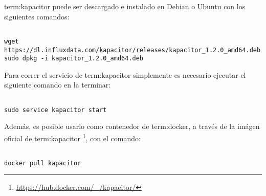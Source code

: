 \gls{term:kapacitor} puede ser descargado e instalado en Debian o Ubuntu con
los siguientes comandos:

\begin{lstlisting}

wget https://dl.influxdata.com/kapacitor/releases/kapacitor_1.2.0_amd64.deb
sudo dpkg -i kapacitor_1.2.0_amd64.deb

\end{lstlisting}

Para correr el servicio de \gls{term:kapacitor} simplemente es necesario
ejecutar el siguiente comando en la terminar:

\begin{lstlisting}

sudo service kapacitor start

\end{lstlisting}

Además, es posible usarlo como contenedor de \gls{term:docker}, a través de la
imágen oficial de \gls{term:kapacitor}
\footnote{\url{https://hub.docker.com/_/kapacitor/}}, con el comando:

\begin{lstlisting}

docker pull kapacitor

\end{lstlisting}
